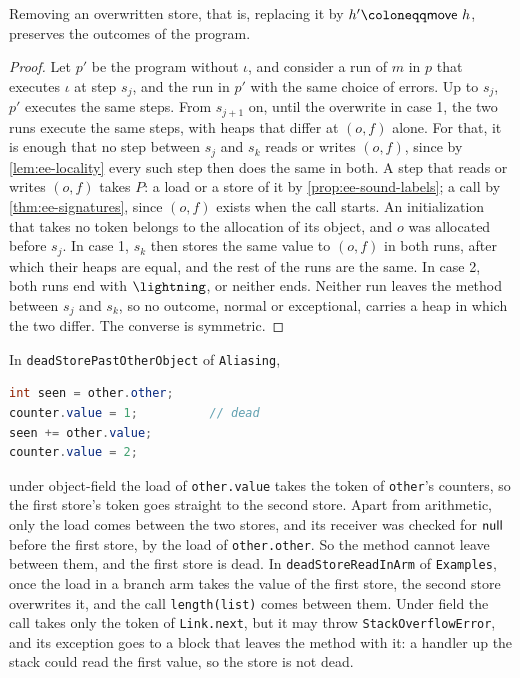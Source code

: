 \begin{theorem}\label{thm:ee-dead}
Removing an overwritten store, that is, replacing it by $h' \coloneqq \move\ h$,
preserves the outcomes of the program.
\end{theorem}

\begin{proof}
Let $p'$ be the program without $\iota$, and consider a run of $m$ in $p$ that
executes $\iota$ at step $s_j$, and the run in $p'$ with the same choice of
errors. Up to $s_j$, $p'$ executes the same steps. From $s_{j+1}$ on, until the
overwrite in case 1, the two runs execute the same steps, with heaps that differ
at $(o, f)$ alone. For that, it is enough that no step between $s_j$ and $s_k$
reads or writes $(o, f)$, since by \cref{lem:ee-locality} every such step then
does the same in both. A step that reads or writes $(o, f)$ takes $P$: a load or
a store of it by \cref{prop:ee-sound-labels}; a call by \cref{thm:ee-signatures},
since $(o, f)$ exists when the call starts. An initialization that takes no
token belongs to the allocation of its object, and $o$ was allocated before
$s_j$. In case 1, $s_k$ then stores the same value to $(o, f)$ in both runs,
after which their heaps are equal, and the rest of the runs are the same. In
case 2, both runs end with $\Trap$, or neither ends. Neither run leaves the
method between $s_j$ and $s_k$, so no outcome, normal or exceptional, carries a
heap in which the two differ. The converse is symmetric.
\end{proof}

\begin{example}\label{ex:ee-java}
In \texttt{deadStorePastOtherObject} of \texttt{Aliasing},
\begin{lstlisting}[language=Java]
int seen = other.other;
counter.value = 1;          // dead
seen += other.value;
counter.value = 2;
\end{lstlisting}
under object-field the load of \texttt{other.value} takes the token of
\texttt{other}'s counters, so the first store's token goes straight to the
second store. Apart from arithmetic, only the load comes between the two
stores, and its receiver was checked for $\mathsf{null}$ before the first store, by the
load of \texttt{other.other}. So the method cannot leave between them, and the
first store is dead. In \texttt{deadStoreReadInArm} of \texttt{Examples}, once
the load in a branch arm takes the value of the first store, the second store
overwrites it, and the call \texttt{length(list)} comes between them. Under
field the call takes only the token of \texttt{Link.next}, but it may throw
\texttt{StackOverflowError}, and its exception goes to a block that leaves the
method with it: a handler up the stack could read the first value, so the
store is not dead.
\end{example}


